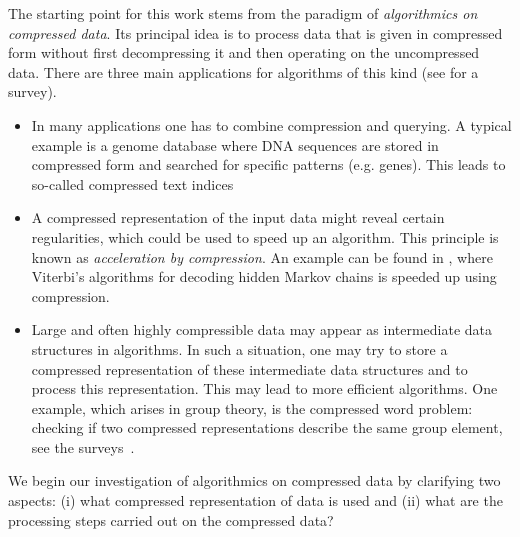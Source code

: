 \documentclass{article}
\begin{document}
The starting point for this work stems from the paradigm of {\em algorithmics on compressed data}. 
Its principal idea is to process data that is given in compressed form without first decompressing it and then operating on the uncompressed data.
There are three main applications for algorithms of this kind (see  \cite{Loh12survey} for a survey).
\begin{itemize}
\item  In many applications one has to combine compression and querying. A typical example 
is a genome database where DNA sequences are stored in compressed form and searched for specific patterns (e.g. genes).
This leads to so-called compressed text indices \cite{CNP21,FeMa05}
\item A compressed representation of the input data might reveal
certain regularities, which could be used to speed up an algorithm. This principle is 
known as {\em acceleration by compression}. An example can be found in \cite{LMWZiv07},
where Viterbi's algorithms for decoding  
hidden Markov chains is speeded up using compression.
\item Large and often highly compressible data may appear as 
intermediate data structures in algorithms. In such a situation, one may try to 
store a compressed representation of these intermediate data structures
and to process this representation. This may lead to more efficient 
algorithms. One example, which arises in group theory, is the compressed word problem:  checking if two compressed representations describe the same group element, see the surveys~\cite{BKLMNRS20,Loh14}.
\end{itemize}
We begin our investigation of algorithmics on compressed data by clarifying two aspects: (i)
what compressed representation of data is used and (ii)
what are the processing steps carried out on the compressed data? 
\end{document}
